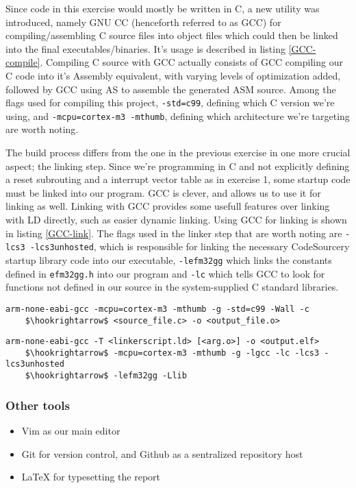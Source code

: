 Since code in this exercise would mostly be written in C, a new utility was introduced, namely GNU CC (henceforth referred to as GCC) for compiling/assembling C source files into object files which could then be linked into the final executables/binaries. It's usage is described in listing \ref{GCC-compile}. Compiling C source with GCC actually consists of GCC compiling our C code into it's Assembly equivalent, with varying levels of optimization added, followed by GCC using AS to assemble the generated ASM source. Among the flags used for compiling this project, \texttt{-std=c99}, defining which C version we're using, and \texttt{-mcpu=cortex-m3 -mthumb}, defining which architecture we're targeting are worth noting.

The build process differs from the one in the previous exercise in one more crucial aspect; the linking step. Since we're programming in C and not explicitly defining a reset subrouting and a interrupt vector table as in exercise 1, some startup code must be linked into our program. GCC is clever, and allows us to use it for linking as well. Linking with GCC provides some usefull features over linking with LD directly, such as easier dynamic linking. Using GCC for linking is shown in listing \ref{GCC-link}. The flags used in the linker step that are worth noting are \texttt{-lcs3 -lcs3unhosted}, which is responsible for linking the necessary CodeSourcery startup library code into our executable, \texttt{-lefm32gg} which links the constants defined in \texttt{efm32gg.h} into our program and \texttt{-lc} which tells GCC to look for functions not defined in our source in the system-supplied C standard libraries.

\begin{lstlisting}[label=GCC-compile, caption=GCC compilation usage, mathescape]
arm-none-eabi-gcc -mcpu=cortex-m3 -mthumb -g -std=c99 -Wall -c
    $\hookrightarrow$ <source_file.c> -o <output_file.o>
\end{lstlisting}

\begin{lstlisting}[label=GCC-link, caption=GCC linking usage, mathescape]
arm-none-eabi-gcc -T <linkerscript.ld> [<arg.o>] -o <output.elf>
    $\hookrightarrow$ -mcpu=cortex-m3 -mthumb -g -lgcc -lc -lcs3 -lcs3unhosted
    $\hookrightarrow$ -lefm32gg -Llib
\end{lstlisting}

\subsubsection{Other tools}

\begin{itemize}
\label{other-tools}
\item Vim as our main editor
\item Git for version control, and Github as a sentralized repository host
\item \LaTeX{} for typesetting the report
\end{itemize}
